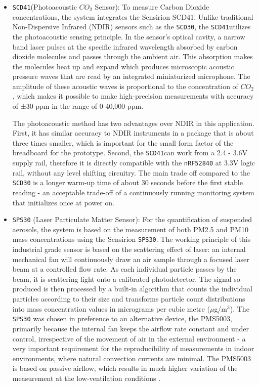 \documentclass[conference]{IEEEtran}
\begin{document}
\begin{itemize}
\item \texttt{SCD41}(Photoacoustic $CO_2$ Sensor): To measure Carbon Dioxide concentrations, the system integrates the Sensirion SCD41. Unlike traditional Non-Dispersive Infrared (NDIR) sensors such as the \texttt{SCD30}, the \texttt{SCD41}utilizes the photoacoustic sensing principle. In the sensor's optical cavity, a narrow band laser pulses at the specific infrared wavelength absorbed by carbon dioxide molecules and passes through the ambient air. This absorption makes the molecules heat up and expand which produces microscopic acoustic pressure waves that are read by an integrated miniaturized microphone. The amplitude of these acoustic waves is proportional to the concentration of $CO_2$, which makes it possible to make high-precision measurements with accuracy of ±30 ppm in the range of 0-40,000 ppm.

The photoacoustic method has two advantages over NDIR in this application. First, it has similar accuracy to NDIR instruments in a package that is about three times smaller, which is important for the small form factor of the breadboard for the prototype. Second, the \texttt{SCD41}can work from a 2.4 - 3.6V supply rail, therefore it is directly compatible with the \texttt{nRF52840} at 3.3V logic rail, without any level shifting circuitry. The main trade off compared to the \texttt{SCD30} is a longer warm-up time of about 30 seconds before the first stable reading - an acceptable trade-off of a continuously running monitoring system that initializes once at power on.

\item \texttt{SPS30} (Laser Particulate Matter Sensor): For the quantification of suspended aerosols, the system is based on the measurement of both PM2.5 and PM10 mass concentrations using the Sensirion \texttt{SPS30}. The working principle of this industrial grade sensor is based on the scattering effect of laser: an internal mechanical fan will continuously draw an air sample through a focused laser beam at a controlled flow rate. As each individual particle passes by the beam, it is scattering light onto a calibrated photodetector. The signal so produced is then processed by a built-in algorithm that counts the individual particles according to their size and transforms particle count distributions into mass concentration values in micrograms per cubic metre ($\mu$g/m$^3$). The \texttt{SPS30} was chosen in preference to an alternative device, the PMS5003, primarily because the internal fan keeps the airflow rate constant and under control, irrespective of the movement of air in the external environment - a very important requirement for the reproducibility of measurements in indoor environments, where natural convection currents are minimal. The PMS5003 is based on passive airflow, which results in much higher variation of the measurement at the low-ventilation conditions \cite{b20}.


\end{itemize}
\end{document}
